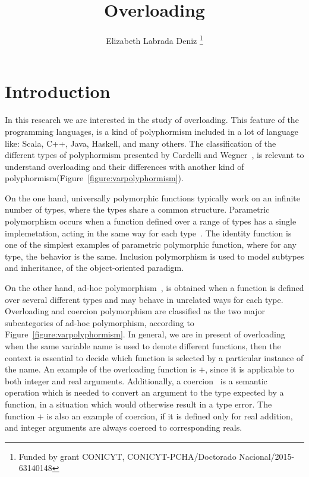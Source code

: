 \documentclass{article}
\title{\bf Overloading}
\author{Elizabeth Labrada Deniz
\thanks{Funded by grant CONICYT, CONICYT-PCHA/Doctorado Nacional/2015-63140148}}
\affil{Computer Science Department (DCC), University of Chile, Chile}
\date{}
\begin{document}
	\maketitle
	\renewcommand{\abstractname}{Abstract}	
	\begin{abstract}
	\end{abstract}	
\section{Introduction}

In this research we are interested in the study of overloading. This feature of the programming languages, is a kind of polyphormism included in a lot of language like: Scala, C++, Java, Haskell, and many others. The classification of the different types of polyphormism presented by Cardelli and Wegner~\cite{CardelliWegner}, is relevant to understand overloading and their differences with another kind of polyphormism(Figure~\ref{figure:varpolyphormism}).

On the one hand, universally polymorphic functions typically work on an infinite number of types, where the types share a common structure. Parametric polymorphism occurs when a function defined over a range of types has a single implemetation, acting in the same way for each type~\cite{CardelliWegner, scott, wadlerBlott:popl89}. The identity function is one of the simplest examples of parametric polymorphic function, where for any type, the behavior is the same. Inclusion polymorphism is used to model subtypes and inheritance, of the object-oriented paradigm.

On the other hand, ad-hoc polymorphism~\cite{CardelliWegner, wadlerBlott:popl89}, is obtained when a function is defined over several different types and may behave in unrelated ways for each type.  Overloading and coercion polymorphism are classified as the two major subcategories of ad-hoc polymorphism, according to Figure~\ref{figure:varpolyphormism}. In general, we are in present of overloading when the same variable name is used to denote different functions, then the context is essential to decide which function is selected by a particular instance of the name. An example of the overloading function is $+$, since it is applicable to both integer and real arguments. Additionally, a coercion~\cite{CardelliWegner} is a semantic operation which is needed to convert an argument to the type expected by a function, in a situation which would otherwise result in a type error. The function $+$ is also an example of coercion, if it is defined only for real addition, and integer arguments are always coerced to corresponding reals.\\
\end{document}
